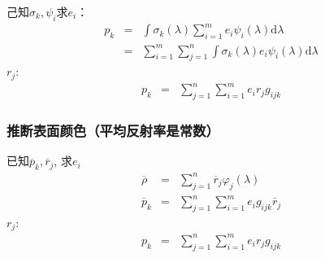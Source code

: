 \documentclass{beamer}
\newcommand{\mathd}{\mathrm{d}}
\newcommand{\nospace}{}
\begin{document}
{{\begin{frame}
  己知$\sigma_k, \psi_i$求$e_i$：
  \begin{eqnarray*}
    p_k & = & \int \sigma_k (\lambda) \sum_{i = 1}^m e_i \psi_i (\lambda)
    \mathd \lambda\\
    & = & \sum_{i = 1}^m \sum_{j = 1}^n \int \sigma_k (\lambda) e_i \psi_i
    (\lambda) \mathd \lambda
  \end{eqnarray*}
  $r_j$:
  \begin{eqnarray*}
    p_k & = & \sum_{j = 1}^n \sum_{i = 1}^m e_i r_j g_{i \nospace j \nospace
    k}
  \end{eqnarray*}
\end{frame}}{\begin{frame}
  \frametitle{推断表面颜色（平均反射率是常数）}
  
  已知$\overline{p}_k, \overline{r}_j$, 求$e_i$
  \begin{eqnarray*}
    \overline{\rho} & = & \sum_{j = 1}^n \overline{r}_j \varphi_j (\lambda)\\
    \overline{p}_k & = & \sum_{j = 1}^n \sum_{i = 1}^m e_i g_{i \nospace j
    \nospace k} \overline{r}_j
  \end{eqnarray*}
  $r_j$:
  \begin{eqnarray*}
    p_k & = & \sum_{j = 1}^n \sum_{i = 1}^m e_i r_j g_{i \nospace j \nospace
    k}
  \end{eqnarray*}
\end{frame}}}
\end{document}
